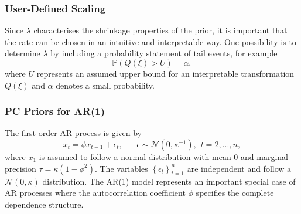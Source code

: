 \subsubsection*{User-Defined Scaling}
Since $\lambda$ characterises the shrinkage properties of the prior, it is important that the rate can be chosen in an intuitive and interpretable way. One possibility is to determine $\lambda$ by including a probability statement of tail events, for example
\begin{equation}
    \mathbb{P}\left(Q\left(\xi\right) > U\right)=\alpha,
\end{equation}
where $U$ represents an assumed upper bound for an interpretable transformation $Q\left(\xi\right)$ and $\alpha$ denotes a small probability.
\subsubsection{PC Priors for AR(1)}
The first-order AR process is given by
\begin{equation}
    x_t=\phi x_{t-1}+\epsilon_t, \hspace{20pt}\epsilon\sim\mathcal{N}\left(0, \kappa^{-1}\right), \hspace{5pt} t=2,...,n,
\end{equation}
where $x_1$ is assumed to follow a normal distribution with mean $0$ and marginal precision $\tau=\kappa\left(1-\phi^2\right)$. The variables $\left\lbrace\epsilon_t\right\rbrace_{t=1}^n$ are independent and follow a $\mathcal{N}\left(0, \kappa\right)$ distribution. The AR(1) model represents an important special case of AR processes where the autocorrelation coefficient $\phi$ specifies the complete dependence structure.
